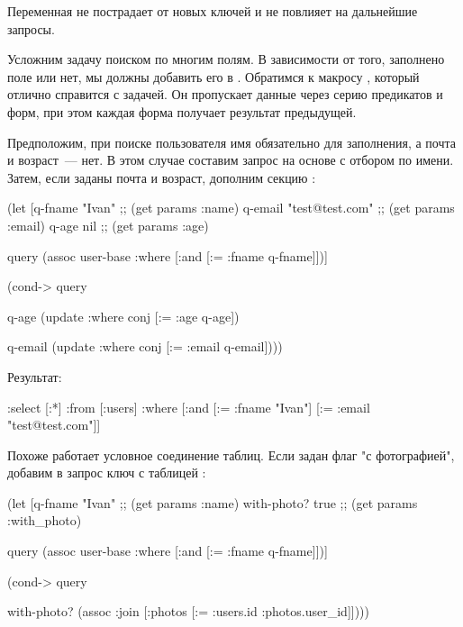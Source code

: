 Переменная  не пострадает от новых ключей и не повлияет на дальнейшие запросы.

Усложним задачу поиском по многим полям. В зависимости от того, заполнено поле или нет, мы должны добавить его в . Обратимся к макросу , который отлично справится с задачей. Он пропускает данные через серию предикатов и форм, при этом каждая форма получает результат предыдущей.

Предположим, при поиске пользователя имя обязательно для заполнения, а почта и возраст~--- нет. В этом случае составим запрос  на основе  с отбором по имени. Затем, если заданы почта и возраст, дополним секцию :

\begin{english}
  \begin{clojure}
(let [q-fname "Ivan"          ;; (get params :name)
      q-email "test@test.com" ;; (get params :email)
      q-age nil               ;; (get params :age)

      query
      (assoc user-base :where [:and [:= :fname q-fname]])]

  (cond-> query

    q-age
    (update :where conj [:= :age q-age])

    q-email
    (update :where conj [:= :email q-email])))
  \end{clojure}
\end{english}

Результат:

\begin{english}
  \begin{clojure}
{:select [:*]
 :from [:users]
 :where [:and
         [:= :fname "Ivan"]
         [:= :email "test@test.com"]]}
  \end{clojure}
\end{english}

Похоже работает условное соединение таблиц. Если задан флаг "с фотографией", добавим в запрос ключ  с таблицей :

\begin{english}
  \begin{clojure}
(let [q-fname "Ivan"   ;; (get params :name)
      with-photo? true ;; (get params :with_photo)

      query
      (assoc user-base :where [:and [:= :fname q-fname]])]

  (cond-> query

    with-photo?
    (assoc :join [:photos [:= :users.id :photos.user_id]])))
  \end{clojure}
\end{english}

